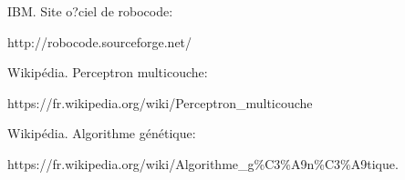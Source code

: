\documentclass[a4paper,portrait,12pt]{article}
\begin{document}
\begin{flushleft}
[1] IBM. Site o?ciel de robocode:
\end{flushleft}





\begin{flushleft}
http://robocode.sourceforge.net/
\end{flushleft}





\begin{flushleft}
[2] Wikip\'{e}dia. Perceptron multicouche:
\end{flushleft}





\begin{flushleft}
https://fr.wikipedia.org/wiki/Perceptron\_multicouche
\end{flushleft}





\begin{flushleft}
[3] Wikip\'{e}dia. Algorithme g\'{e}n\'{e}tique:
\end{flushleft}





\begin{flushleft}
https://fr.wikipedia.org/wiki/Algorithme\_g\%C3\%A9n\%C3\%A9tique.
\end{flushleft}





\newpage
\end{document}
